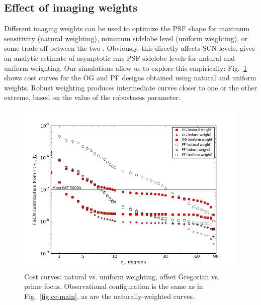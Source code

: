 \documentclass{aa}
\begin{document}
\subsection{Effect of imaging weights}
\label{sec:img-weights}

Different imaging weights can be used to optimize the PSF shape for maximum sensitivity (natural weighting), minimum sidelobe level (uniform weighting), or some trade-off between the two \citep[robust or Briggs weighting:][]{briggs-thesis}. Obviously, this directly affects SCN levels. \citet{SKA49} gives an analytic estimate of asymptotic rms PSF sidelobe levels for natural and uniform weighting. Our simulations allow us to explore this empirically: Fig.~\ref{fig:cc-weights} shows cost curves for the OG and PF designs obtained using natural and uniform weights. Robust weighting produces intermediate curves closer to one or the other extreme, based on the value of the robustness parameter.

\begin{figure}
  \includegraphics[width=\columnwidth]{cc-mk-nat-vs-uni}
\caption{\label{fig:cc-weights}Cost curves: natural vs. uniform weighting, offset Gregorian vs. prime focus. Observational configuration is the same as in Fig.~\ref{fig:cc-main}, as are the naturally-weighted curves.}
\end{figure}
\end{document}
